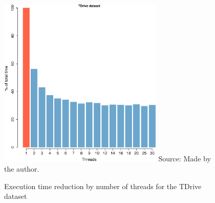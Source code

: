 {\begin{figure}[h!]
    \centering
    \caption{Execution time reduction by number of threads for the TDrive dataset}
    \includegraphics[width=0.7\textwidth]{images/TDrive_thread.eps}
    \footnotesize{Source: Made by the author.}
    \label{fig:tdrive_threads}
\end{figure}

}
